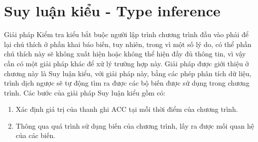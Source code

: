 \chapter{Suy luận kiểu - Type inference}
Giải pháp Kiểm tra kiểu bắt buộc người lập trình chương trình đầu vào phải để lại chú thích ở phần khai báo biến, tuy nhiên, trong vì một số lý do, có thể phần chú thích này sẽ không xuất hiện hoặc không thể hiện đầy đủ thông tin, vì vậy cần có một giải pháp khác để xử lý trường hợp này. Giải pháp được giới thiệu ở chương này là Suy luận kiểu, với giải pháp này, bằng các phép phân tích dữ liệu, trình dịch ngược sẽ tự động tìm ra được các bộ biến được sử dụng trong chương trình. Các bước của giải pháp Suy luận kiểu gồm có:
\begin{enumerate}
	\item Xác định giá trị của thanh ghi ACC tại mỗi thời điểm của chương trình.
	\item Thông qua quá trình sử dụng biến của chương trình, lấy ra được mối quan hệ của các biến.
\end{enumerate}

